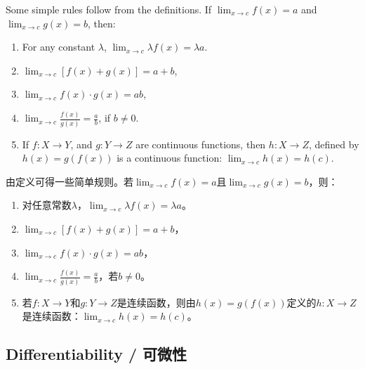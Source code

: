 \begin{original}
Some simple rules follow from the definitions. If $\lim_{x \to c} f(x) = a$ and $\lim_{x \to c} g(x) = b$, then:
\begin{enumerate}
\item For any constant $\lambda$, $\lim_{x \to c} \lambda f(x) = \lambda a$.
\item $\lim_{x \to c}[f(x) + g(x)] = a + b$,
\item $\lim_{x \to c} f(x) \cdot g(x) = ab$,
\item $\lim_{x \to c} \frac{f(x)}{g(x)} = \frac{a}{b}$, if $b \neq 0$.
\item If $f: X \to Y$, and $g: Y \to Z$ are continuous functions, then $h: X \to Z$, defined by $h(x) = g(f(x))$ is a continuous function: $\lim_{x \to c} h(x) = h(c)$.
\end{enumerate}
\end{original}
\begin{translation}
由定义可得一些简单规则。若$\lim_{x \to c} f(x) = a$且$\lim_{x \to c} g(x) = b$，则：
\begin{enumerate}
\item 对任意常数$\lambda$，$\lim_{x \to c} \lambda f(x) = \lambda a$。
\item $\lim_{x \to c}[f(x) + g(x)] = a + b$，
\item $\lim_{x \to c} f(x) \cdot g(x) = ab$，
\item $\lim_{x \to c} \frac{f(x)}{g(x)} = \frac{a}{b}$，若$b \neq 0$。
\item 若$f: X \to Y$和$g: Y \to Z$是连续函数，则由$h(x) = g(f(x))$定义的$h: X \to Z$是连续函数：$\lim_{x \to c} h(x) = h(c)$。
\end{enumerate}
\end{translation}

\subsection{Differentiability / 可微性}

